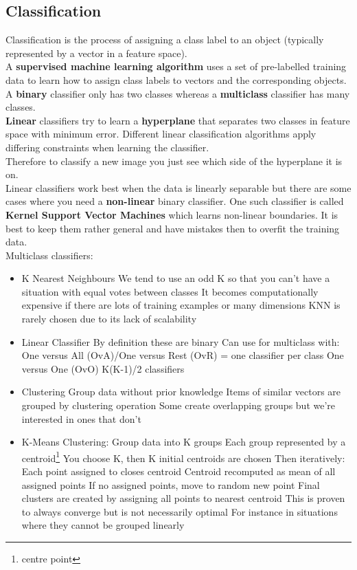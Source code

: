\documentclass{article}
\begin{document}
	\subsection{Classification}
	Classification is the process of assigning a class label to an object (typically represented by a vector in a feature space).\\
	A \textbf{supervised machine learning algorithm} uses a set of pre-labelled training data to learn how to assign class labels to vectors and the corresponding objects.\\
	A \textbf{binary} classifier only has two classes whereas a \textbf{multiclass} classifier has many classes.\\
	\textbf{Linear} classifiers try to learn a \textbf{hyperplane} that separates two classes in feature space with minimum error. Different linear classification algorithms apply differing constraints when learning the classifier.\\
	Therefore to classify a new image you just see which side of the hyperplane it is on.\\
	Linear classifiers work best when the data is linearly separable but there are some cases where you need a \textbf{non-linear} binary classifier. One such classifier is called \textbf{Kernel Support Vector Machines} which learns non-linear boundaries. It is best to keep them rather general and have mistakes then to overfit the training data.\\
	Multiclass classifiers:
	\begin{itemize}
		\item K Nearest Neighbours
		\subitem We tend to use an odd K so that you can't have a situation with equal votes between classes
		\subitem It becomes computationally expensive if there are lots of training examples or many dimensions
		\subitem KNN is rarely chosen due to its lack of scalability
		\item Linear Classifier
		\subitem By definition these are binary
		\subitem Can use for multiclass with:
		\subsubitem One versus All (OvA)/One versus Rest (OvR) = one classifier per class
		\subsubitem One versus One (OvO) K(K-1)/2 classifiers
		\item Clustering
		\subitem Group data without prior knowledge
		\subitem Items of similar vectors are grouped by clustering operation
		\subitem Some create overlapping groups but we're interested in ones that don't
		\item K-Means Clustering:
		\subitem Group data into K groups
		\subitem Each group represented by a centroid\footnote{centre point}
		\subitem You choose K, then K initial centroids are chosen
		\subitem Then iteratively:
		\subsubitem Each point assigned to closes centroid
		\subsubitem Centroid recomputed as mean of all assigned points
		\subsubitem If no assigned points, move to random new point
		\subitem Final clusters are created by assigning all points to nearest centroid
		\subitem This is proven to always converge but is not necessarily optimal
		\subsubitem For instance in situations where they cannot be grouped linearly
	\end{itemize}
\end{document}
